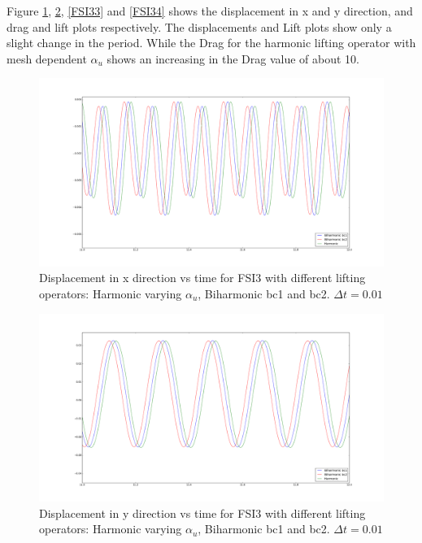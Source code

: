 Figure \ref{FSI31}, \ref{FSI32}, \ref{FSI33} and \ref{FSI34} shows the displacement in x and y direction, and drag and lift plots respectively. The displacements and Lift plots show only a slight change in the period. While the Drag for the harmonic lifting operator with mesh dependent $\alpha_u$ shows an increasing in the Drag value of about 10.

\begin{figure}[H] 
    \centering	
    \includegraphics[trim={3cm 3cm 3cm 3cm},clip,scale=0.20]{./Mesh_motion_results/FSI3_dt0001_dis_x.png} 
    \caption{Displacement in x direction vs time for FSI3 with different lifting operators: Harmonic varying $\alpha_u$, Biharmonic bc1 and bc2. $\Delta t = 0.01$}
    \label{FSI31}
\end{figure}
\begin{figure}[H]
    \centering
    \includegraphics[trim={3cm 3cm 3cm 3cm},scale=0.20]{./Mesh_motion_results/FSI3_dt0001_dis_y.png} 
    \caption{Displacement in y direction vs time for FSI3 with different lifting operators: Harmonic varying $\alpha_u$, Biharmonic bc1 and bc2. $\Delta t = 0.01$}
    \label{FSI32}
\end{figure}
